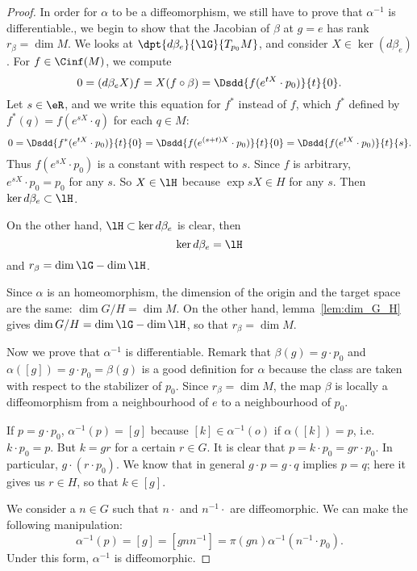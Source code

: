 \begin{proof}
	In order for $\alpha$ to be a diffeomorphism, we still have to prove that $\alpha^{-1}$ is differentiable., we begin to show that the Jacobian of $\beta$ at $g=e$ has rank $r_{\beta}=\dim M$. We looks at $\dpt{d\beta_e}{\lG}{T_{p_0}M}$, and consider $X\in\ker (d\beta_e)$. For $f\in\Cinf(M)$, we compute
	\begin{equation}
		0=(d\beta_e X)f=X(f\circ\beta)=\Dsdd{ f(e^{tX}\cdot p_0) }{t}{0}.
	\end{equation}
	Let $s\in\eR$, and we write this equation for $f^*$ instead of $f$, which $f^*$ defined by $f^*(q)=f(e^{sX}\cdot q)$ for each $q\in M$:
	\begin{equation}
		0=\Dsdd{f^*(e^{tX}\cdot p_0)}{t}{0}
		=\Dsdd{ f(e^{(s+t)X}\cdot p_0) }{t}{0}
		=\Dsdd{ f(e^{tX}\cdot p_0) }{t}{s}.
	\end{equation}
	Thus $f(e^{sX}\cdot p_0)$ is a constant with respect to $s$. Since $f$ is arbitrary, $e^{sX}\cdot p_0=p_0$ for any $s$. So $X\in\lH$ because $\exp sX\in H$ for any $s$. Then $\ker d\beta_e\subset \lH$.

	On the other hand, $\lH\subset\ker d\beta_e$ is clear, then
	\[
		\ker d\beta_e=\lH
	\]
	and $r_{\beta}=\dim\lG-\dim\lH$.

	Since $\alpha$ is an homeomorphism, the dimension of the origin and the target space are the same: $\dim G/H=\dim M$. On the other hand, lemma~\ref{lem:dim_G_H} gives $\dim G/H=\dim\lG-\dim\lH$, so that $r_{\beta}=\dim M$.

	Now we prove that $\alpha^{-1}$ is differentiable. Remark that $\beta(g)=g\cdot p_0$ and $\alpha([g])=g\cdot p_0=\beta(g)$ is a good definition for $\alpha$ because the class are taken with respect to the stabilizer of $p_0$. Since $r_{\beta}=\dim M$, the map $\beta$ is locally a diffeomorphism from a neighbourhood of $e$ to a neighbourhood of $p_0$.

	If $p=g\cdot p_0$, $\alpha^{-1}(p)=[g]$ because $[k]\in\alpha^{-1}(o)$ if $\alpha([k])=p$, i.e. $k\cdot p_0=p$. But $k=gr$ for a certain $r\in G$. It is clear that $p=k\cdot p_0=gr\cdot p_0$. In particular, $g\cdot(r\cdot p_0)$. We know that in general $g\cdot p=g\cdot q$ implies $p=q$; here it gives us $r\in H$, so that $k\in [g]$.

	We consider a $n\in G$ such that $n\cdot$ and $n^{-1}\cdot$ are diffeomorphic. We can make the following manipulation:
	\begin{equation}
		\alpha^{-1}(p)=[g]
		=[gnn^{-1}]
		=\pi(gn)\alpha^{-1}(n^{-1}\cdot p_0).
	\end{equation}
	Under this form, $\alpha^{-1}$ is diffeomorphic.



\end{proof}
